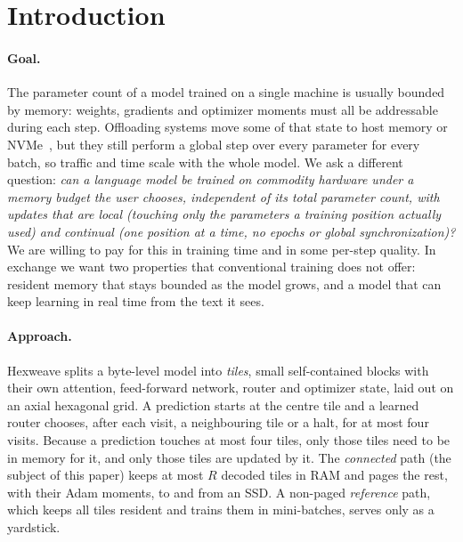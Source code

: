 \documentclass[10pt]{article}
\begin{document}
\section{Introduction}

\paragraph{Goal.}
The parameter count of a model trained on a single machine is usually bounded by memory: weights,
gradients and optimizer moments must all be addressable during each step. Offloading systems move
some of that state to host memory or NVMe~\citep{ren2021zerooffload,rajbhandari2021zeroinfinity}, but
they still perform a global step over every parameter for every batch, so traffic and time scale
with the whole model. We ask a different question: \emph{can a language model be trained on
commodity hardware under a memory budget the user chooses, independent of its total parameter
count, with updates that are local (touching only the parameters a training position actually used)
and continual (one position at a time, no epochs or global synchronization)?} We are willing to pay
for this in training time and in some per-step quality. In exchange we want two properties that
conventional training does not offer: resident memory that stays bounded as the model grows, and a
model that can keep learning in real time from the text it sees.

\paragraph{Approach.}
Hexweave splits a byte-level model into \emph{tiles}, small self-contained blocks with their own
attention, feed-forward network, router and optimizer state, laid out on an axial hexagonal grid. A
prediction starts at the centre tile and a learned router chooses, after each visit, a neighbouring
tile or a halt, for at most four visits. Because a prediction touches at most four tiles, only those
tiles need to be in memory for it, and only those tiles are updated by it. The \emph{connected} path
(the subject of this paper) keeps at most $R$ decoded tiles in RAM and pages the rest, with their
Adam moments, to and from an SSD. A non-paged \emph{reference} path, which keeps all tiles resident
and trains them in mini-batches, serves only as a yardstick.
\end{document}
